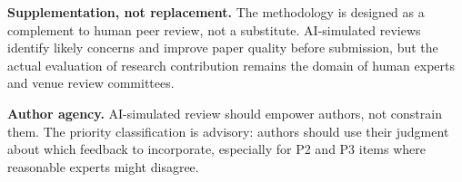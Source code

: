 \textbf{Supplementation, not replacement.} The methodology is designed as a complement to human peer review, not a substitute. AI-simulated reviews identify likely concerns and improve paper quality before submission, but the actual evaluation of research contribution remains the domain of human experts and venue review committees.

\textbf{Author agency.} AI-simulated review should empower authors, not constrain them. The priority classification is advisory: authors should use their judgment about which feedback to incorporate, especially for P2 and P3 items where reasonable experts might disagree.
